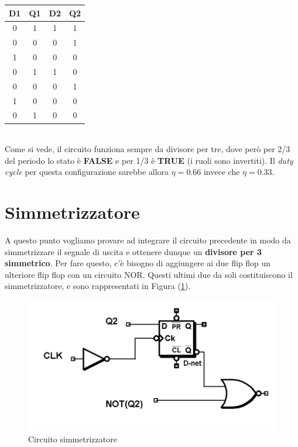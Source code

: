 \documentclass[journal, a4paper]{IEEEtran}
\begin{document}
\begin{table}[h]
\centering
\begin{tabular}{c|c||c|c}
\hline \textbf{D1} & \textbf{Q1} & \textbf{D2} & \textbf{Q2} \\ 
\hline 0 & 1 & 1 & 1 \\ 
 0 & 0 & 0 & 1 \\
 1 & 0 & 0 & 0 \\ 
 0 & 1 & 1 & 0 \\ 
 0 & 0 & 0 & 1 \\
 1 & 0 & 0 & 0 \\
 0 & 1 & 0 & 0\\
 
\hline
 \end{tabular} 
\end{table}
~\\
Come si vede, il circuito funziona sempre da divisore per tre, dove però per 2/3 del periodo lo stato è \textbf{FALSE} e per 1/3 è \textbf{TRUE} (i ruoli sono invertiti). Il \textit{duty cycle} per questa configurazione sarebbe allora $\eta = 0.66$ invece che $\eta = 0.33$.

\section{Simmetrizzatore}
A questo punto vogliamo  provare ad integrare il circuito precedente in modo da simmetrizzare il segnale di uscita e ottenere dunque un \textbf{divisore per 3 simmetrico}. Per fare questo, c'è bisogno di aggiungere ai due flip flop un ulteriore flip flop con un circuito \textsc{NOR}. Questi ultimi due da soli costituiscono il simmetrizzatore, e sono rappresentati in Figura (\ref{fig:es15_simmet}).\\

\begin{figure}
\centering
\includegraphics[width=0.8\linewidth]{./es15_simmet}
\caption{Circuito simmetrizzatore}
\label{fig:es15_simmet}
\end{figure}
\end{document}
